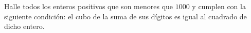 Halle todos los enteros positivos que son menores que $1000$ y cumplen con la siguiente condición: el cubo de la suma de sus dígitos es igual al cuadrado de dicho entero.
